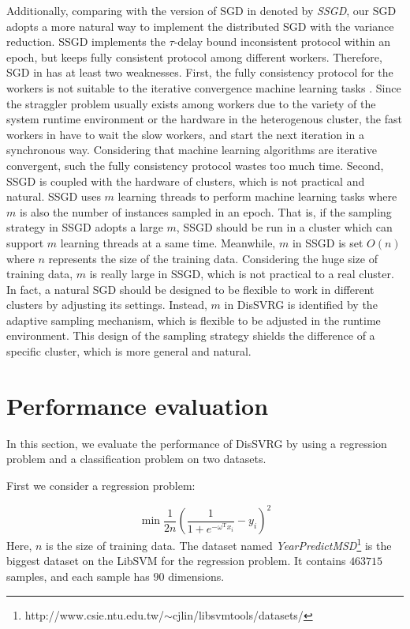 \documentclass[10pt,journal,finalsubmission,compsoc]{IEEEtran}
\begin{document}
Additionally, comparing with the version of SGD in \cite{Zhang:2015tp} denoted by \emph{SSGD}, our SGD adopts a more natural way to implement the distributed SGD with the variance reduction. SSGD implements the $\tau$-delay bound inconsistent protocol within an epoch, but keeps fully consistent protocol among different workers. Therefore, SGD in \cite{Zhang:2015tp} has at least two weaknesses. First, the fully consistency protocol for the workers is not suitable to the iterative convergence machine learning tasks \cite{2015_dai_high_performance_ml, Li:2014uy, Dai:2013vj}. Since the straggler problem usually exists among workers due to the variety of the system runtime environment or the hardware in the heterogenous cluster, the fast workers in \cite{Zhang:2015tp} have to wait the slow workers, and start the next iteration in a synchronous way. Considering that machine learning algorithms are iterative convergent, such the fully consistency protocol wastes too much time. Second, SSGD is coupled with the hardware of clusters, which is not practical and natural. SSGD uses $m$ learning threads to perform machine learning tasks where $m$ is also the number of instances sampled in an epoch. That is, if the sampling strategy in SSGD adopts a large $m$, SSGD should be run in a cluster which can support $m$ learning threads at a same time. Meanwhile, $m$ in SSGD is set $O(n)$ where $n$ represents the size of the training data. Considering the huge size of training data, $m$ is really large in SSGD, which is not practical to a real cluster. In fact, a natural SGD should be designed to be flexible to work in different clusters by adjusting its settings. Instead, $m$ in DisSVRG is identified by the adaptive sampling mechanism, which is flexible to be adjusted in the runtime environment. This design of the sampling strategy shields the difference of a specific cluster, which is more general and natural.


\section{Performance evaluation}
\label{performance_evaluation}
In this section, we evaluate the performance of DisSVRG by using a regression problem and a classification problem on two datasets.

First we consider a regression problem:

\begin{equation}
\label{standard_sgd}
\min \frac{1}{2n}\left(\frac{1}{1+e^{-\omega^\mathrm{T}x_i}}-y_i\right)^2
\end{equation}
Here, $n$ is the size of training data. The dataset named \emph{YearPredictMSD}\footnote{http://www.csie.ntu.edu.tw/$\sim$cjlin/libsvmtools/datasets/} is the biggest dataset on the LibSVM for the regression problem. It contains $463715$ samples, and each sample has $90$ dimensions. 
\end{document}
